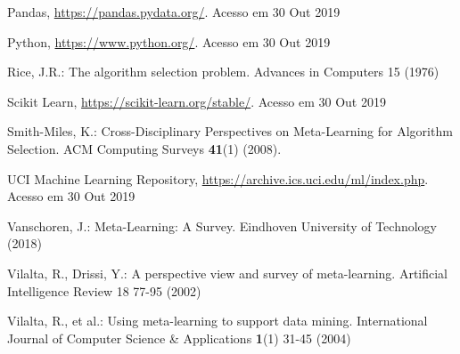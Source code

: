 \documentclass[runningheads]{llncs}
\begin{document}
\begin{thebibliography}{8}
Pandas, \url{https://pandas.pydata.org/}. Acesso em 30 Out 2019

Python, \url{https://www.python.org/}. Acesso em 30 Out 2019

Rice, J.R.: The algorithm selection problem. Advances in Computers 15 (1976)

Scikit Learn, \url{https://scikit-learn.org/stable/}. Acesso em 30 Out 2019

Smith-Miles, K.: Cross-Disciplinary Perspectives on Meta-Learning for Algorithm Selection. ACM Computing Surveys \textbf{41}(1) (2008). 

UCI Machine Learning Repository, \url{https://archive.ics.uci.edu/ml/index.php}. Acesso em 30 Out 2019

Vanschoren, J.: Meta-Learning: A Survey. Eindhoven University of Technology (2018)

Vilalta, R., Drissi, Y.: A perspective view and survey of meta-learning. Artificial Intelligence Review 18 77-95 (2002)

Vilalta, R., et al.: Using meta-learning to support data mining. International Journal of Computer Science & Applications \textbf{1}(1) 31-45 (2004)

\end{thebibliography}
\end{document}
